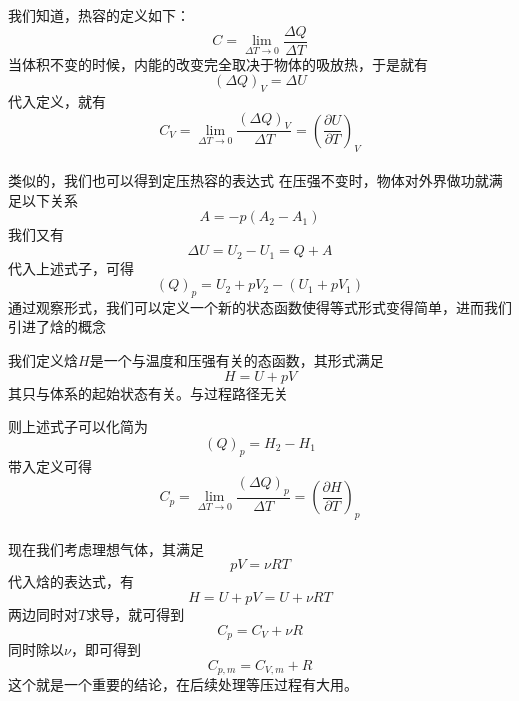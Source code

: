 \documentclass[lang=cn,10pt]{elegantbook}
\begin{document}
	我们知道，热容的定义如下：
	\begin{equation*}
		C=\lim_{\varDelta T\rightarrow 0} \frac{\varDelta Q}{\varDelta T}
	\end{equation*}
	当体积不变的时候，内能的改变完全取决于物体的吸放热，于是就有
	\begin{equation*}
		\left( \varDelta Q \right) _V=\varDelta U
	\end{equation*}
	代入定义，就有
	\begin{equation*}
		C_{V}=\lim_{\varDelta T\rightarrow 0} \frac{	\left( \varDelta Q \right) _V}{\varDelta T}=\left( \frac{\partial U}{\partial T} \right) _V
	\end{equation*}
	~\\
	类似的，我们也可以得到定压热容的表达式
	在压强不变时，物体对外界做功就满足以下关系
	\begin{equation*}
		A=-p(A_{2}-A_{1})
	\end{equation*}
	我们又有
	\begin{equation*}
		\varDelta U=U_{2}-U_{1}=Q+A 
	\end{equation*}
	代入上述式子，可得
	\begin{equation*}
		(Q)_{p}=U_{2}+pV_{2}-(U_{1}+pV_{1})
	\end{equation*}
	通过观察形式，我们可以定义一个新的状态函数使得等式形式变得简单，进而我们引进了焓的概念
	\begin{definition}[焓]
		我们定义焓$H$是一个与温度和压强有关的态函数，其形式满足
		\begin{equation*}
			H=U+pV
		\end{equation*}
		其只与体系的起始状态有关。与过程路径无关
	\end{definition}
	则上述式子可以化简为
	\begin{equation*}
		(Q)_{p}=H_{2}-H_{1}
	\end{equation*}
	带入定义可得
	\begin{equation*}
		C_{p}=\lim_{\varDelta T\rightarrow 0} \frac{	\left( \varDelta Q \right) _p}{\varDelta T}=\left( \frac{\partial H}{\partial T} \right) _p
	\end{equation*}
	~\\
	现在我们考虑理想气体，其满足
	\begin{equation*}
		pV=\nu RT
	\end{equation*}
	代入焓的表达式，有
	\begin{equation*}
		H=U+pV=U+\nu RT
	\end{equation*}
	两边同时对$T$求导，就可得到
	\begin{equation*}
		C_{p}=C_{V}+\nu R
	\end{equation*}
	同时除以$\nu $，即可得到
	\begin{equation*}
		C_{p,m}=C_{V,m}+ R
	\end{equation*}
	这个就是一个重要的结论，在后续处理等压过程有大用。
	
\end{document}
